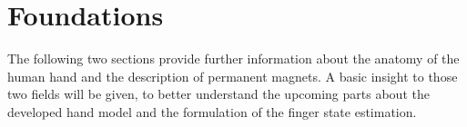 
\lhead[\chaptername~\thechapter]{\rightmark}

\rhead[\leftmark]{}

\lfoot[\thepage]{}

\cfoot{}

\rfoot[]{\thepage}


\chapter{Foundations} \label{cha:foundations}

The following two sections provide further information about the anatomy of the human hand and the description of permanent magnets. A basic insight to those two fields will be given, to better understand the upcoming parts about the developed hand model and the formulation of the finger state estimation.

